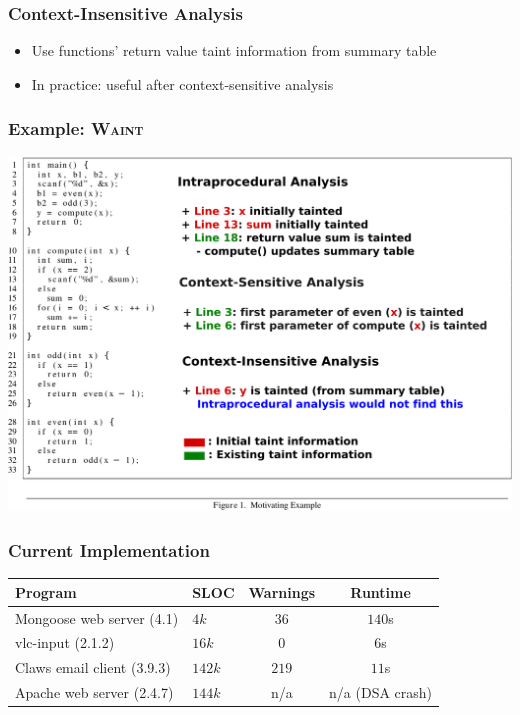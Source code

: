 \documentclass[xcolor=dvipsnames]{beamer}
\newcommand{\waint}{\textsc{Waint}\xspace}
\begin{document}
\begin{frame}
  \frametitle{Context-Insensitive Analysis} {
   \Large
   \begin{itemize}
   \item Use functions' return value taint information from summary table
	\vspace{0.5cm}   
   \item In practice: useful after context-sensitive analysis
   
	\end{itemize}
	}
\end{frame}

\begin{frame}
  \frametitle{Example: \waint} 
    {\small
    \begin{center}
	\includegraphics[scale=0.55]{example-waint}   	
	\end{center}   
	}
\end{frame}

\begin{frame}
  \frametitle{Current Implementation}
   \small
\begin{center}
\begin{tabular}{|l|l|c|c|}
\hline
\textbf{Program} 			& \textbf{SLOC}	&	\textbf{Warnings}	&	\textbf{Runtime}		\\ \hline
\hline
Mongoose web server (4.1)	& $4k$	&	$36$		&	$140$s		\\	\hline
vlc-input (2.1.2)			& $16k$ &	$0$			&	$6$s		\\ \hline
Claws email client (3.9.3)	& $142k$&	$219$		&	$11$s		\\ 	\hline
Apache web server (2.4.7)	& $144k$&	n/a			&	n/a (DSA crash) \\ 	\hline
\end{tabular}
\end{center} 
\end{frame}
\end{document}
